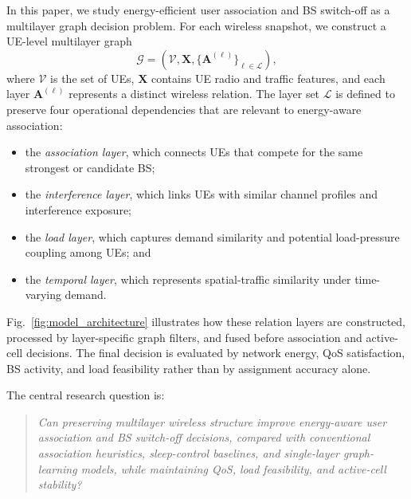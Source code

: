\documentclass[journal]{IEEEtran}
\begin{document}
In this paper, we study energy-efficient user association and BS switch-off as
a multilayer graph decision problem. For each wireless snapshot, we construct a
UE-level multilayer graph
\begin{equation}
    \mathcal{G} = \left(\mathcal{V}, \mathbf{X},
    \{\mathbf{A}^{(\ell)}\}_{\ell \in \mathcal{L}}\right),
\end{equation}
where $\mathcal{V}$ is the set of UEs, $\mathbf{X}$ contains UE radio and
traffic features, and each layer $\mathbf{A}^{(\ell)}$ represents a distinct
wireless relation. The layer set $\mathcal{L}$ is defined to preserve four
operational dependencies that are relevant to energy-aware association:
\begin{itemize}
    \item the \emph{association layer}, which connects UEs that compete for
    the same strongest or candidate BS;
    \item the \emph{interference layer}, which links UEs with similar channel
    profiles and interference exposure;
    \item the \emph{load layer}, which captures demand similarity and
    potential load-pressure coupling among UEs; and
    \item the \emph{temporal layer}, which represents spatial-traffic
    similarity under time-varying demand.
\end{itemize}
Fig.~\ref{fig:model_architecture} illustrates how these relation layers are
constructed, processed by layer-specific graph filters, and fused before
association and active-cell decisions. The final decision is evaluated by
network energy, QoS satisfaction, BS activity, and load feasibility rather than
by assignment accuracy alone.

The central research question is:
\begin{quote}
\emph{Can preserving multilayer wireless structure improve energy-aware user
association and BS switch-off decisions, compared with conventional association
heuristics, sleep-control baselines, and single-layer graph-learning models,
while maintaining QoS, load feasibility, and active-cell stability?}
\end{quote}
\end{document}
